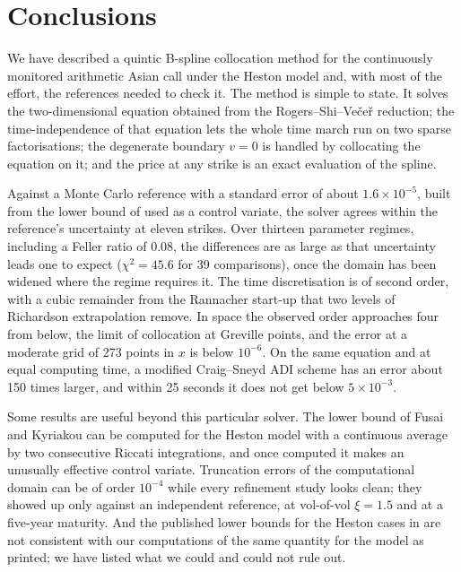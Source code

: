 \section{Conclusions}\label{sec:conclusions}

We have described a quintic B-spline collocation method for the continuously monitored arithmetic Asian
call under the Heston model and, with most of the effort, the references needed to check it. The method
is simple to state. It solves the two-dimensional equation obtained from the Rogers--Shi--Ve\v{c}e\v{r}
reduction; the time-independence of that equation lets the whole time march run on two sparse
factorisations; the degenerate boundary $v=0$ is handled by collocating the equation on it; and the price
at any strike is an exact evaluation of the spline.

Against a Monte Carlo reference with a standard error of about $1.6\times10^{-5}$, built from the lower
bound of \citet{FusaiKyriakou2016} used as a control variate, the solver agrees within the reference's
uncertainty at eleven strikes. Over thirteen parameter regimes, including a Feller ratio of $0.08$, the
differences are as large as that uncertainty leads one to expect ($\chi^2=45.6$ for 39 comparisons), once
the domain has been widened where the regime requires it. The
time discretisation is of second order, with a cubic remainder from the Rannacher start-up that two levels
of Richardson extrapolation remove. In space the observed order approaches four from below, the limit of
collocation at Greville points, and the error at a moderate grid of 273 points in $x$ is below
$10^{-6}$. On the same equation and at equal computing time, a modified Craig--Sneyd ADI scheme has an error
about 150 times larger, and within 25 seconds it does not get below $5\times10^{-3}$.

Some results are useful beyond this particular solver. The lower bound of Fusai and Kyriakou can be
computed for the Heston model with a continuous average by two consecutive Riccati integrations, and once
computed it makes an unusually effective control variate. Truncation errors of the computational domain
can be of order $10^{-4}$ while every refinement study looks clean; they showed up only against an
independent reference, at vol-of-vol $\xi=1.5$ and at a five-year maturity. And the published lower bounds
for the Heston cases in \citet{FusaiKyriakou2016} are not consistent with our computations of the same
quantity for the model as printed; we have listed what we could and could not rule out.

